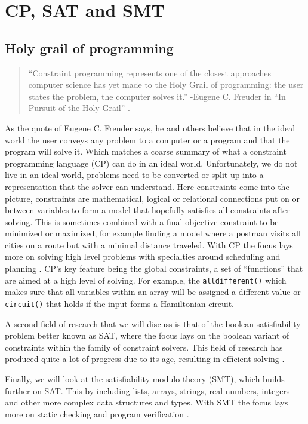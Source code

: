 \chapter{CP, SAT and SMT}
\label{cha:2:CS}
\label{CS:Intro}
\label{CS:HolyGrail}
\section{Holy grail of programming}
\begin{quote}
	“Constraint programming represents one of the closest approaches computer science has yet made to the Holy Grail of programming: the user states the problem, the computer solves it.” 
	\newline
	-Eugene C. Freuder in “In Pursuit of the Holy Grail” \cite{11freuder1997pursuitHolyGrail}.
\end{quote}
As the quote of Eugene C. Freuder says, he and others believe that in the ideal world the user conveys any problem to a computer or a program and that the program will solve it. Which matches a coarse summary of what a constraint programming language (CP) can do in an ideal world. Unfortunately, we do not live in an ideal world, problems need to be converted or split up into a representation that the solver can understand. 
Here constraints come into the picture, constraints are mathematical, logical or relational connections put on or between variables to form a model that hopefully satisfies all constraints after solving. This is sometimes combined with a final objective constraint to be minimized or maximized, for example finding a model where a postman visits all cities on a route but with a minimal distance traveled. 
With CP the focus lays more on solving high level problems with specialties around scheduling and planning \cite{52bartak1999constraint}. CP’s key feature being the global constraints, a set of “functions” that are aimed at a high level of solving. For example, the \texttt{alldifferent()} which makes sure that all variables within an array will be assigned a different value or \texttt{circuit()} that holds if the input forms a Hamiltonian circuit.

A second field of research that we will discuss is that of the boolean satisfiability problem better known as SAT, where the focus lays on the boolean variant of constraints within the family of constraint solvers. This field of research has produced quite a lot of progress due to its age, resulting in efficient solving \cite{56bardin2019bringing}.

Finally, we will look at the satisfiability modulo theory (SMT), which builds further on SAT. This by including lists, arrays, strings, real numbers, integers and other more complex data structures and types. With SMT the focus lays more on static checking and program verification \cite{56bardin2019bringing, 54moura2008z3}.


